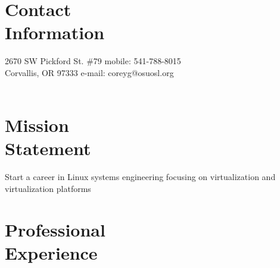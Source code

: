 \documentclass[margin,line]{resume}
\begin{document}
\begin{resume}

    \section{\mysidestyle Contact\\Information}

    2670 SW Pickford St. \#79   \hfill mobile: 541-788-8015         \vspace{0mm}\\\vspace{0mm}%
    Corvallis, OR 97333         \hfill e-mail: coreyg@osuosl.org  \vspace{0mm}\\\vspace{-4.5mm}\\

    \section{\mysidestyle Mission\\Statement}

    Start a career in Linux systems engineering focusing on virtualization
    and virtualization platforms\\

    \section{\mysidestyle Professional\\Experience}


\end{resume}
\end{document}
